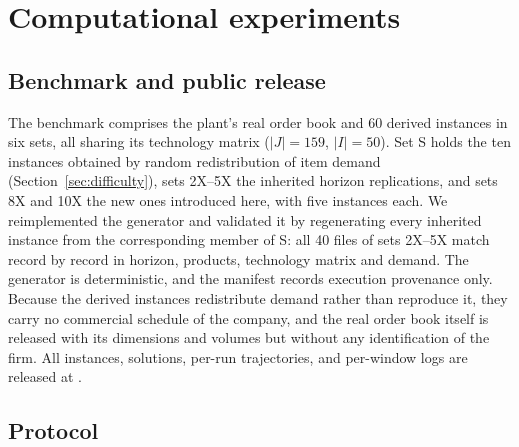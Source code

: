 \section{Computational experiments}
\label{sec:experiments}

\subsection{Benchmark and public release}
\label{sec:benchmark}

The benchmark comprises the plant's real order book and 60 derived
instances in six sets, all sharing its technology matrix
($|J|=159$, $|I|=50$). Set S holds the ten instances obtained by
random redistribution of item demand
(Section~\ref{sec:difficulty}), sets 2X--5X the inherited horizon
replications, and sets 8X and 10X the new ones introduced here, with
five instances each. We reimplemented the generator and validated it
by regenerating every inherited instance from the corresponding member
of S: all 40 files of sets 2X--5X match record by record in horizon,
products, technology matrix and demand. The generator is
deterministic, and the manifest records execution provenance only.
Because the derived instances redistribute demand rather than
reproduce it, they carry no commercial schedule of the company, and
the real order book itself is released with its dimensions and
volumes but without any identification of the firm. All instances, solutions,
per-run trajectories, and per-window logs are released at
.

\subsection{Protocol}
\label{sec:protocol}

